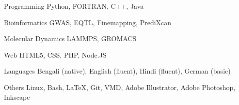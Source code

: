 


\begin{cvskills}


\cvskill
{Programming} %
{Python, FORTRAN, C++, Java} %


\cvskill
{Bioinformatics}
{GWAS, EQTL, Finemapping, PrediXcan}

\cvskill
{Molecular Dynamics} %
{LAMMPS, GROMACS} %


\cvskill
{Web} %
{HTML5, CSS, PHP, Node.JS} %


\cvskill
{Languages} %
{Bengali (native), English (fluent), Hindi (fluent), German (basic)} %


\cvskill
{Others} %
{Linux, Bash, {\LaTeX}, Git, VMD, Adobe Illustrator, Adobe Photoshop, Inkscape} %



\end{cvskills}
